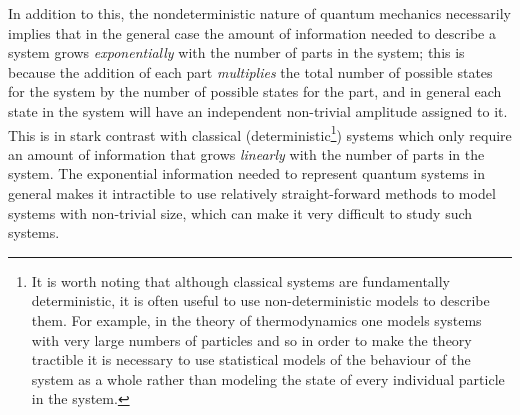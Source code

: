 \documentclass[12pt]{amsbook}
\theoremstyle{plain}
\theoremstyle{definition}
\theoremstyle{remark}
\begin{document}
In addition to this, the nondeterministic nature of quantum mechanics necessarily implies that in the general case the amount of information needed to describe a system grows \emph{exponentially} with the number of parts in the system;  this is because the addition of each part \emph{multiplies} the total number of possible states for the system by the number of possible states for the part, and in general each state in the system will have an independent non-trivial amplitude assigned to it.  This is in stark contrast with classical (deterministic\footnote{It is worth noting that although classical systems are fundamentally deterministic, it is often useful to use non-deterministic models to describe them.  For example, in the theory of thermodynamics one models systems with very large numbers of particles and so in order to make the theory tractible it is necessary to use statistical models of the behaviour of the system as a whole rather than modeling the state of every individual particle in the system.}) systems which only require an amount of information that grows \emph{linearly} with the number of parts in the system.  The exponential information needed to represent quantum systems in general makes it intractible to use relatively straight-forward methods to model systems with non-trivial size, which can make it very difficult to study such systems.
\end{document}
